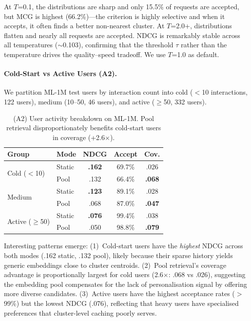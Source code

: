 \documentclass[sigconf,nonacm=false]{acmart}
\begin{document}
At $T$=0.1, the distributions are sharp and only 15.5\% of requests are accepted, but MCG is highest (66.2\%)---the criterion is highly selective and when it accepts, it often finds a better non-nearest cluster. At $T$=2.0+, distributions flatten and nearly all requests are accepted. NDCG is remarkably stable across all temperatures ($\sim$0.103), confirming that the threshold $\tau$ rather than the temperature drives the quality--speed tradeoff. We use $T$=1.0 as default.

\paragraph{Cold-Start vs Active Users (A2).}
We partition ML-1M test users by interaction count into cold ($<$10 interactions, 122 users), medium (10--50, 46 users), and active ($\geq$50, 332 users).

\begin{table}[t]
\centering
\caption{(A2) User activity breakdown on ML-1M. Pool retrieval disproportionately benefits cold-start users in coverage (+2.6$\times$).}
\label{tab:a2}
\small
\begin{tabular}{ll ccc}
\toprule
\textbf{Group} & \textbf{Mode} & \textbf{NDCG} & \textbf{Accept} & \textbf{Cov.} \\
\midrule
\multirow{2}{*}{Cold ($<$10)}
& Static & \textbf{.162} & 69.7\% & .026 \\
& \cellcolor{gray!15} Pool & \cellcolor{gray!15} .132 & \cellcolor{gray!15} 66.4\% & \cellcolor{gray!15} \textbf{.068} \\
\midrule
\multirow{2}{*}{Medium}
& Static & \textbf{.123} & 89.1\% & .028 \\
& \cellcolor{gray!15} Pool & \cellcolor{gray!15} .068 & \cellcolor{gray!15} 87.0\% & \cellcolor{gray!15} \textbf{.047} \\
\midrule
\multirow{2}{*}{Active ($\geq$50)}
& Static & \textbf{.076} & 99.4\% & .038 \\
& \cellcolor{gray!15} Pool & \cellcolor{gray!15} .050 & \cellcolor{gray!15} 98.8\% & \cellcolor{gray!15} \textbf{.079} \\
\bottomrule
\end{tabular}
\end{table}

Interesting patterns emerge: (1)~Cold-start users have the \emph{highest} NDCG across both modes (.162 static, .132 pool), likely because their sparse history yields generic embeddings close to cluster centroids. (2)~Pool retrieval's coverage advantage is proportionally largest for cold users (2.6$\times$: .068 vs .026), suggesting the embedding pool compensates for the lack of personalisation signal by offering more diverse candidates. (3)~Active users have the highest acceptance rates ($>$99\%) but the lowest NDCG (.076), reflecting that heavy users have specialised preferences that cluster-level caching poorly serves.
\end{document}
